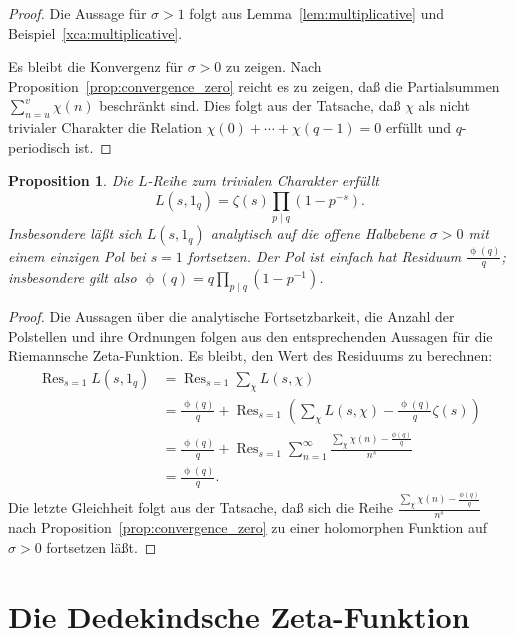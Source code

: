 \documentclass[a4paper,twoside,openright]{report}
\newtheorem{prop}[thm]{Proposition}
\theoremstyle{definition}
\theoremstyle{remark}
\DeclareMathOperator{\Res}{Res}
\DeclareMathOperator{\totient}{\phi}
\begin{document}
\begin{proof}
  Die Aussage für $\sigma > 1$ folgt aus Lemma~\ref{lem:multiplicative} und
  Beispiel~\ref{xca:multiplicative}.
  
  Es bleibt die Konvergenz für $\sigma > 0$ zu zeigen. Nach Proposition~\ref{prop:convergence_zero}
  reicht es zu zeigen, daß die Partialsummen $\sum_{n = u}^v \chi(n)$ beschränkt sind.
  Dies folgt aus der Tatsache, daß $\chi$ als nicht trivialer Charakter die Relation
  $\chi(0) + \dotsb + \chi(q - 1) = 0$ erfüllt und $q$-periodisch ist.
\end{proof}

\begin{prop}
  Die $L$-Reihe zum trivialen Charakter erfüllt
  \[
    L(s, 1_q) = \zeta(s) \prod_{p \mid q} (1 - p^{-s}).
  \]
  Insbesondere läßt sich $L(s, 1_q)$ analytisch auf die offene Halbebene $\sigma > 0$
  mit einem einzigen Pol bei $s = 1$ fortsetzen. Der Pol ist einfach hat Residuum $\frac{\totient(q)}{q}$;
  insbesondere gilt also $\totient(q) = q \prod_{p \mid q} (1 - p^{-1})$. 
\end{prop}

\begin{proof}
  Die Aussagen über die analytische Fortsetzbarkeit, die Anzahl der Polstellen und ihre Ordnungen
  folgen aus den entsprechenden Aussagen für die Riemannsche Zeta-Funktion. Es
  bleibt, den Wert des Residuums zu berechnen:
  \[
    \begin{split}
      \Res_{s = 1} L(s, 1_q)
      & = \Res_{s = 1} \sum_\chi L(s, \chi) \\
      & = \frac{\totient(q)} q + \Res_{s = 1} \left(\sum_\chi L(s, \chi) - \frac{\totient(q)} q \zeta(s)\right) \\
      & = \frac{\totient(q)} q + \Res_{s = 1} \sum_{n = 1}^\infty \frac{\sum_\chi \chi(n) - \frac {\phi(q)} q}{n^s} \\
      & = \frac{\totient(q)} q.
    \end{split}
  \]
  Die letzte Gleichheit folgt aus der Tatsache, daß sich die Reihe
  $\frac{\sum_\chi \chi(n) - \frac {\phi(q)} q} {n^s}$ nach Proposition~\ref{prop:convergence_zero} zu
  einer holomorphen Funktion auf $\sigma > 0$ fortsetzen läßt.
\end{proof}

\section{Die Dedekindsche Zeta-Funktion}
\end{document}
